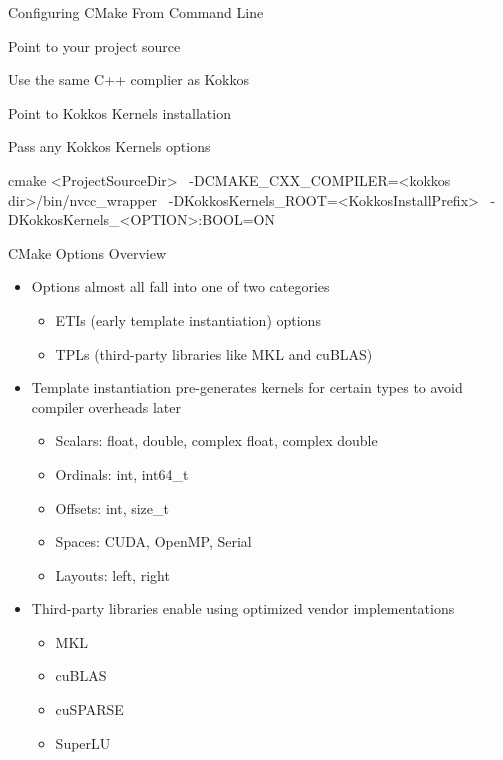 \begin{frame}[fragile]{Configuring CMake From Command Line}
\begin{itemize}
 { \item Point to your project source }
 { \item Use the same C++ complier as Kokkos }
 { \item Point to Kokkos Kernels installation  }
 { \item Pass any Kokkos Kernels options }
\end{itemize}
\begin{shell}[linebackground={
  \btLstHL<2>{1}{orange!30}
  \btLstHL<3>{2}{orange!30}
  \btLstHL<4>{3}{orange!30}
  \btLstHL<5>{4}{orange!30}    
}]
    cmake <ProjectSourceDir> \
      -DCMAKE_CXX_COMPILER=<kokkos dir>/bin/nvcc_wrapper \
      -DKokkosKernels_ROOT=<KokkosInstallPrefix> \
      -DKokkosKernels_<OPTION>:BOOL=ON 
\end{shell}
\end{frame}

\begin{frame}[fragile]{CMake Options Overview}
\begin{itemize}
\item Options almost all fall into one of two categories
\begin{itemize}
	\item ETIs (early template instantiation) options
	\item TPLs (third-party libraries like MKL and cuBLAS)
\end{itemize}
\item Template instantiation pre-generates kernels for certain types to avoid compiler overheads later
\begin{itemize}
	\item Scalars: float, double, complex float, complex double
	\item Ordinals: int, int64\_t
	\item Offsets: int, size\_t
	\item Spaces: CUDA, OpenMP, Serial
	\item Layouts: left, right
\end{itemize}
\item Third-party libraries enable using optimized vendor implementations
\begin{itemize}
	\item MKL
	\item cuBLAS
	\item cuSPARSE
	\item SuperLU
\end{itemize}
\end{itemize}
\end{frame}

